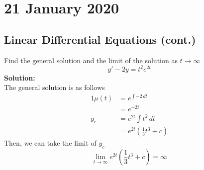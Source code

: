 \documentclass[diffeq.tex]{subfiles}
\begin{document}
\chapter{21 January 2020}
    \section{Linear Differential Equations (cont.)}
    \begin{example}
        Find the general solution and the limit of the solution as $t \to \infty$
        \begin{equation}
            y' - 2y = t^{2}e^{2t}
        \end{equation}
        \textbf{Solution:}\\
        The general solution is as follows
        \begin{alignat}{1}
            \mu(t) &= e^{\int -2\,dt}\\
            &= e^{-2t}\\
            y_{c} &= e^{2t}\int t^{2}\,dt\\
            &= e^{2t}\left(\frac{1}{3}t^{3} + c\right)
        \end{alignat}
        Then, we can take the limit of $y_{c}$
        \begin{equation}
            \lim_{t \to \infty} e^{2t}\left(\frac{1}{3}t^{3} + c\right) = \infty
        \end{equation}
    \end{example}
    \np
\end{document}
